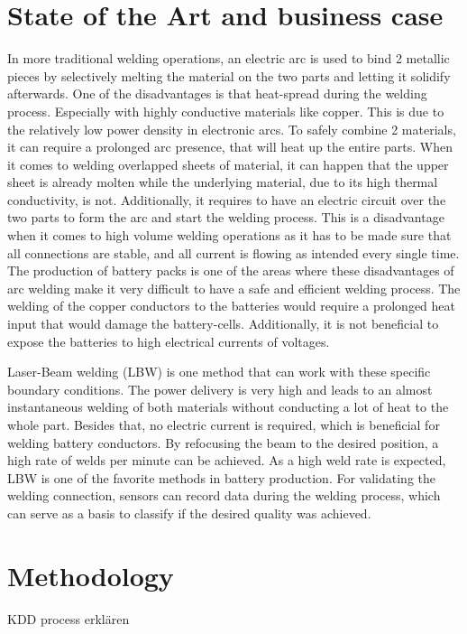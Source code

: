 \documentclass[12pt]{report}
\begin{document}
\chapter{State of the Art and business case}
In more traditional welding operations, an electric arc is used to bind 2 metallic pieces by selectively melting the material on the two parts and letting it solidify afterwards. One of the disadvantages is that heat-spread during the welding process. Especially with highly conductive materials like copper. This is due to the relatively low power density in electronic arcs. To safely combine 2 materials, it can require a prolonged arc presence, that will heat up the entire parts. When it comes to welding overlapped sheets of material, it can happen that the upper sheet is already molten while the underlying material, due to its high thermal conductivity, is not. Additionally, it requires to have an electric circuit over the two parts to form the arc and start the welding process. This is a disadvantage when it comes to high volume welding operations as it has to be made sure that all connections are stable, and all current is flowing as intended every single time.
The production of battery packs is one of the areas where these disadvantages of arc welding make it very difficult to have a safe and efficient welding process. The welding of the copper conductors to the batteries would require a prolonged heat input that would damage the battery-cells. Additionally, it is not beneficial to expose the batteries to high electrical currents of voltages.


Laser-Beam welding (LBW) is one method that can work with these specific boundary conditions.
The power delivery is very high and leads to an almost instantaneous welding of both materials without conducting a lot of heat to the whole part. Besides that, no electric current is required, which is beneficial for welding battery conductors. By refocusing the beam to the desired position, a high rate of welds per minute can be achieved. As a high weld rate is expected, LBW is one of the favorite methods in battery production.
For validating the welding connection, sensors can record data during the welding process, which can serve as a basis to classify if the desired quality was achieved. %

\chapter{Methodology}
KDD process erklären
\end{document}
